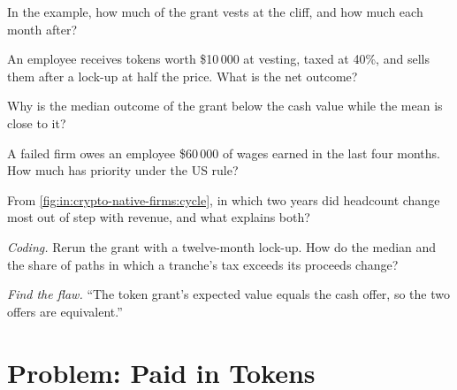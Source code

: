 \begin{exercise}[$\star$]\label{exo:in:crypto-native-firms:2}
In the example, how much of the grant vests at the cliff, and how much each month after?
\end{exercise}

\begin{exercise}[$\star$]\label{exo:in:crypto-native-firms:3}
An employee receives tokens worth \$10\,000 at vesting, taxed at 40\%, and sells them after a lock-up at half the price.
What is the net outcome?
\end{exercise}

\begin{exercise}[$\star\star$]\label{exo:in:crypto-native-firms:4}
Why is the median outcome of the grant below the cash value while the mean is close to it?
\end{exercise}

\begin{exercise}[$\star\star$]\label{exo:in:crypto-native-firms:5}
A failed firm owes an employee \$60\,000 of wages earned in the last four months. How much has priority under the US rule?
\end{exercise}

\begin{exercise}[$\star\star$]\label{exo:in:crypto-native-firms:6}
From \cref{fig:in:crypto-native-firms:cycle}, in which two years did headcount change most out of step with
revenue, and what explains both?
\end{exercise}

\begin{exercise}[$\star\star\star$]\label{exo:in:crypto-native-firms:7}
\emph{Coding.} Rerun the grant with a twelve-month lock-up. How do the median and the share of paths in which a
tranche's tax exceeds its proceeds change?
\end{exercise}

\begin{exercise}[$\star\star\star$]\label{exo:in:crypto-native-firms:8}
\emph{Find the flaw.} ``The token grant's expected value equals the cash offer, so the two offers are equivalent.''
\end{exercise}

\section{Problem: Paid in Tokens}

